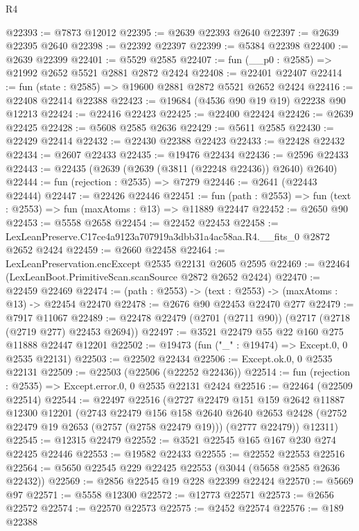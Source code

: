 \begin{lexlean}{R4}
\begin{coremodule}
@22393 := @7873 @12012
@22395 := @2639 @22393 @2640
@22397 := @2639 @22395 @2640
@22398 := @22392 @22397
@22399 := @5384 @22398
@22400 := @2639 @22399
@22401 := @5529 @2585
@22407 := fun (__p0 : @2585) => @21992 @2652 @5521 @2881 @2872 @2424
@22408 := @22401 @22407
@22414 := fun (state : @2585) => @19600 @2881 @2872 @5521 @2652 @2424
@22416 := @22408 @22414 @22388
@22423 := @19684 (@4536 @90 @19 @19) @22238 @90 @12213
@22424 := @22416 @22423
@22425 := @22400 @22424
@22426 := @2639 @22425
@22428 := @5608 @2585 @2636
@22429 := @5611 @2585
@22430 := @22429 @22414
@22432 := @22430 @22388 @22423
@22433 := @22428 @22432
@22434 := @2607 @22433
@22435 := @19476 @22434
@22436 := @2596 @22433
@22443 := @22435 (@2639 (@2639 (@3811 (@22248 @22436)) @2640) @2640)
@22444 := fun (rejection : @2535) => @7279
@22446 := @2641 (@22443 @22444)
@22447 := @22426 @22446
@22451 := fun (path : @2553) => fun (text : @2553) => fun (maxAtoms : @13) => @11889 @22447
@22452 := @2650 @90
@22453 := @5558 @2658
@22454 := @22452 @22453
@22458 := LexLeanPreserve.C17ce4a9123a707919a3dbb31a4ac58aa.R4.__fits_0 @2872 @2652 @2424
@22459 := @2660 @22458
@22464 := LexLeanPreservation.encExcept @2535 @22131 @2605 @2595
@22469 := @22464 (LexLeanBoot.PrimitiveScan.scanSource @2872 @2652 @2424)
@22470 := @22459 @22469
@22474 := (path : @2553) -> (text : @2553) -> (maxAtoms : @13) -> @22454 @22470
@22478 := @2676 @90 @22453 @22470 @277
@22479 := @7917 @11067
@22489 := @22478 @22479 (@2701 (@2711 @90)) (@2717 (@2718 (@2719 @277) @22453 @2694))
@22497 := @3521 @22479 @55 @22 @160 @275 @11888 @22447 @12201
@22502 := @19473 (fun ("_" : @19474) => Except.{0, 0} @2535 @22131)
@22503 := @22502 @22434
@22506 := Except.ok.{0, 0} @2535 @22131
@22509 := @22503 (@22506 (@22252 @22436))
@22514 := fun (rejection : @2535) => Except.error.{0, 0} @2535 @22131 @2424
@22516 := @22464 (@22509 @22514)
@22544 := @22497
    @22516
    (@2727
      @22479
      @151
      @159
      @2642
      @11887
      @12300
      @12201
      (@2743
        @22479
        @156
        @158
        @2640
        @2640
        @2653
        @2428
        (@2752 @22479 @19 @2653 (@2757 (@2758 @22479 @19)))
        (@2777 @22479))
      @12311)
@22545 := @12315 @22479
@22552 := @3521 @22545 @165 @167 @230 @274 @22425 @22446
@22553 := @19582 @22433
@22555 := @22552 @22553 @22516
@22564 := @5650 @22545 @229 @22425 @22553 (@3044 (@5658 @2585 @2636 @22432))
@22569 := @2856 @22545 @19 @228 @22399 @22424
@22570 := @5669 @97
@22571 := @5558 @12300
@22572 := @12773 @22571
@22573 := @2656 @22572
@22574 := @22570 @22573
@22575 := @2452 @22574
@22576 := @189 @22388

\end{coremodule}
\end{lexlean}
